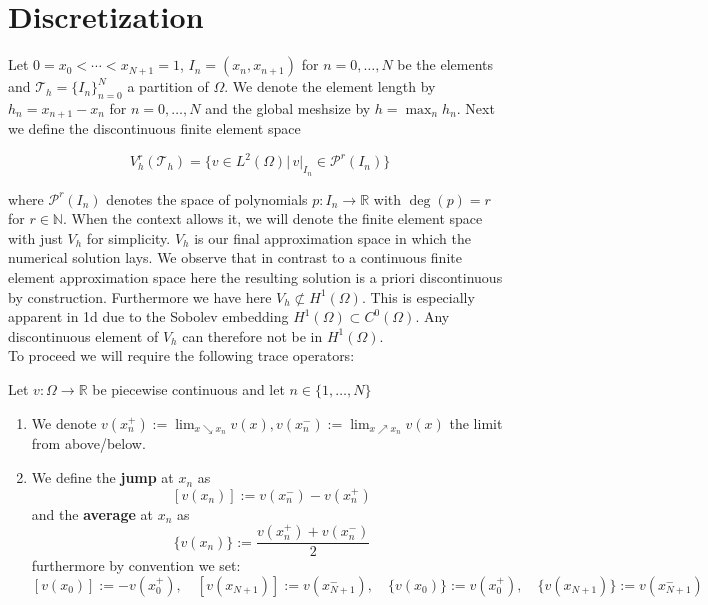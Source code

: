 \section{Discretization}
Let $0=x_0 < \cdots < x_{N+1} = 1$, $I_n = (x_n, x_{n+1})$ for $n = 0,\ldots,N$ be the elements and $\mathcal{T}_h = \{I_n\}_{n=0}^N$ a partition
of $\Omega$.
We denote the element length by $h_n = x_{n+1} - x_{n}$ for $n=0,\ldots,N$ and the global meshsize by
$h = \max_{n} h_n$.
Next we define the discontinuous finite element space
\begin{tcolorbox}[mythmstyle, colback=green!10!white]
\begin{equation}
    V_h^r(\mathcal{T}_h) = \{v \in L^2(\Omega) |\, v|_{I_n} \in \mathcal{P}^r(I_n) \} 
\end{equation}
\end{tcolorbox}
where $\mathcal{P}^r(I_n)$ denotes the space of polynomials $p:I_n \to \mathbb{R}$ with $\deg(p) = r$
for $r \in \mathbb{N}$. When the context allows it, we will denote the
finite element space with just $V_h$ for simplicity. 
$V_h$ is our final approximation space in which the numerical solution
lays.
We observe that in contrast to a continuous finite element approximation space 
here the resulting solution is a priori discontinuous by construction. 
Furthermore we have here $V_h \not\subset H^1(\Omega)$. 
This is especially apparent in 1d due to the Sobolev embedding $H^1(\Omega) \subset C^0(\Omega)$.
Any discontinuous element of $V_h$ can therefore not be in $H^1(\Omega)$. \\
To proceed we will require the following trace operators:

\begin{definition} 
    Let $v:\Omega \to \mathbb{R}$ be piecewise continuous and let $n \in
    \{1,\ldots,N\}$
    \begin{enumerate}[label=\textnormal{(\roman*)}]
        \item We denote $v(x_n^+) := \lim_{x \searrow x_n} v(x), v(x_n^-) := \lim_{x \nearrow x_n} v(x)$
        the limit from above/below.
        \item We define the \textbf{jump} at $x_n$ as
        \[
        [v(x_n)]:= v(x_n^-) - v(x_n^+)
        \]
        and the \textbf{average} at $x_n$ as
        \[
            \{v(x_n)\}:= \frac{v(x_n^+) + v(x_n^-)}{2}
        \]
        furthermore by convention we set: 
        \[
            [v(x_0)] := -v(x_0^+),\quad [v(x_{N+1})] := v(x_{N+1}^-),\quad 
            \{v(x_0)\}:=v(x_0^+),\quad \{v(x_{N+1})\}:= v(x_{N+1}^-)
        \]  
    \end{enumerate}
\end{definition}

